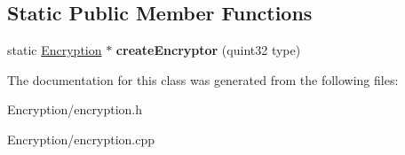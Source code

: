 \subsection*{Static Public Member Functions}
\begin{DoxyCompactItemize}
\item 
static \hyperlink{class_encryption}{Encryption} $\ast$ {\bfseries create\+Encryptor} (quint32 type)\hypertarget{class_encryption_a35ee86579a689e8a68909b9ca34c457f}{}\label{class_encryption_a35ee86579a689e8a68909b9ca34c457f}

\end{DoxyCompactItemize}


The documentation for this class was generated from the following files\+:\begin{DoxyCompactItemize}
\item 
Encryption/encryption.\+h\item 
Encryption/encryption.\+cpp\end{DoxyCompactItemize}
